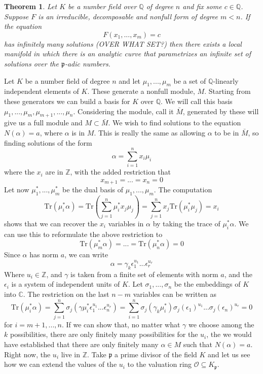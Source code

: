 \documentclass{article}
\newtheorem{theorem}{Theorem}[section]
\newcommand{\mfrak}[1]{\mathfrak{#1}}
\newcommand{\mcal}[1]{\mathcal{#1}}
\newcommand{\mbb}[1]{\mathbb{#1}}
\newcommand{\tr}[1]{\text{Tr}(#1)}
\begin{document}
\begin{theorem}
    Let $K$ be a number field over $\mbb Q$ of degree $n$ and fix some $c \in \mbb Q$. Suppose $F$ is an irreducible, decomposable and nonfull form of degree $m < n$. If the equation 
    $$F(x_1, ..., x_m) = c$$
    has infinitely many solutions (OVER WHAT SET?) then there exists a local manifold in which there is an analytic curve that parametrizes an infinite set of solutions over the $\mfrak{p}$-adic numbers.   
\end{theorem}


Let $K$ be a number field of degree $n$ and let $\mu_1, ..., \mu_m$ be a set of $\mbb{Q}$-linearly independent elements of $K$. These generate a nonfull module, $M$. Starting from these generators we can build a basis for $K$ over $\mbb{Q}$. We will call this basis $\mu_1, ..., \mu_m, \mu_{m+1}, ..., \mu_n$. Considering the module, call it $\bar M$, generated by these will give us a full module and $M \subset \bar M$. We wish to find solutions to the equation $N(\alpha) = a$, where $\alpha$ is in $M$. This is really the same as allowing $\alpha$ to be in $\bar M$, so finding solutions of the form
$$\alpha = \sum_{i=1}^n x_i \mu_i$$
where the $x_i$ are in $\mbb{Z}$, with the added restriction that 
$$x_{m+1} = ... = x_n = 0$$
Let now $\mu_1^*, ..., \mu_m^*$ be the dual basis of $\mu_1, ..., \mu_m$. The computation 
$$\tr{\mu_i^* \alpha} = \tr {\sum_{j=1}^n \mu_i^* x_j \mu_j} = \sum_{j=1}^n x_j \tr{\mu_i^* \mu_j} = x_i$$
shows that we can recover the $x_i$ variables in $\alpha$ by taking the trace of $\mu_i^*\alpha$. We can use this to reformulate the above restriction to
$$\tr{\mu_m^* \alpha} = ... = \tr{\mu_n^* \alpha} = 0$$
Since $\alpha$ has norm $a$, we can write
\begin{equation}\label{eq:ExpressionForAlpha}
    \alpha = \gamma_k \epsilon_1^{u_1}...\epsilon_r^{u_r}
\end{equation}
Where $u_i \in \mbb{Z}$, and $\gamma$ is taken from a finite set of elements with norm $a$, and the $\epsilon_i$ is a system of independent units of $K$. Let $\sigma_1, ..., \sigma_n$ be the embeddings of $K$ into $\mbb{C}$. The restriction on the last $n-m$ variables can be written as 
$$\tr{\mu_i^* \alpha } = \sum_{j = 1}^n \sigma_j(\gamma \mu_i^* \epsilon_1^{u_1}...\epsilon_n^{u_r}) = \sum_{i = 1}^n \sigma_j(\gamma_k \mu_i^* ) \sigma_j(\epsilon_1)^{u_1}...\sigma_j(\epsilon_n)^{u_r} = 0$$
for $i = m+1, ..., n$. If we can show that, no matter what $\gamma$ we choose among the $k$ possibilities, there are only finitely many possibilities for the $u_i$, the we would have established that there are only finitely many $\alpha \in M$ such that $N(\alpha) = a$. Right now, the $u_i$ live in $\mbb{Z}$. Take $\mfrak p$ a prime divisor of the field $K$ and let us see how we can extend the values of the $u_i$ to the valuation ring $\mcal O \subseteq K_\mfrak{p}$.
\end{document}
